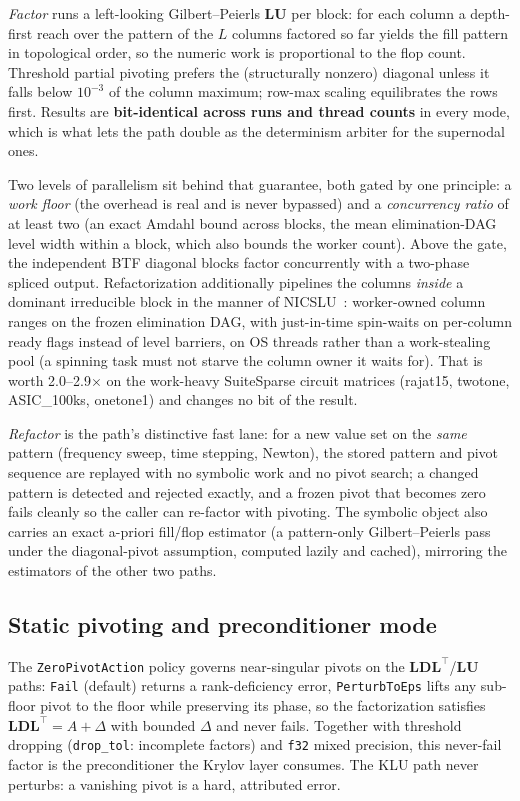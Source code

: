 \documentclass[11pt,a4paper]{article}
\newcommand{\code}[1]{\texttt{\small #1}}
\newcommand{\LDLt}{\mathbf{L}\mathbf{D}\mathbf{L}^{\!\top}}
\newcommand{\LU}{\mathbf{L}\mathbf{U}}
\begin{document}
\emph{Factor} runs a left-looking Gilbert--Peierls $\LU$ per block: for each column a
depth-first reach over the pattern of the $L$ columns factored so far yields the fill
pattern in topological order, so the numeric work is proportional to the flop count.
Threshold partial pivoting prefers the (structurally nonzero) diagonal unless it falls
below $10^{-3}$ of the column maximum; row-max scaling equilibrates the rows first.
Results are \textbf{bit-identical across runs and thread counts} in every mode, which is
what lets the path double as the determinism arbiter for the supernodal ones.

Two levels of parallelism sit behind that guarantee, both gated by one principle: a
\emph{work floor} (the overhead is real and is never bypassed) and a \emph{concurrency
ratio} of at least two (an exact Amdahl bound across blocks, the mean elimination-DAG
level width within a block, which also bounds the worker count). Above the gate, the
independent BTF diagonal blocks factor concurrently with a two-phase spliced output.
Refactorization additionally pipelines the columns \emph{inside} a dominant irreducible
block in the manner of NICSLU~\cite{nicslu}: worker-owned column ranges on the frozen
elimination DAG, with just-in-time spin-waits on per-column ready flags instead of level
barriers, on OS threads rather than a work-stealing pool (a spinning task must not starve
the column owner it waits for). That is worth \numrange{2.0}{2.9}$\times$ on the
work-heavy SuiteSparse circuit matrices (rajat15, twotone, ASIC\_100ks, onetone1) and
changes no bit of the result.

\emph{Refactor} is the path's distinctive fast lane: for a new value set on the
\emph{same} pattern (frequency sweep, time stepping, Newton), the stored pattern and
pivot sequence are replayed with no symbolic work and no pivot search; a changed pattern
is detected and rejected exactly, and a frozen pivot that becomes zero fails cleanly so
the caller can re-factor with pivoting. The symbolic object also carries an exact
a-priori fill/flop estimator (a pattern-only Gilbert--Peierls pass under the
diagonal-pivot assumption, computed lazily and cached), mirroring the estimators of the
other two paths.

\subsection{Static pivoting and preconditioner mode}
The \code{ZeroPivotAction} policy governs near-singular pivots on the $\LDLt$/$\LU$
paths: \code{Fail} (default) returns a rank-deficiency error, \code{PerturbToEps} lifts
any sub-floor pivot to the floor while preserving its phase, so the factorization
satisfies $\LDLt=A+\Delta$ with bounded $\Delta$ and never fails. Together with
threshold dropping (\code{drop\_tol}: incomplete factors) and \code{f32} mixed
precision, this never-fail factor is the preconditioner the Krylov layer consumes.
The KLU path never perturbs: a vanishing pivot is a hard, attributed error.
\end{document}
